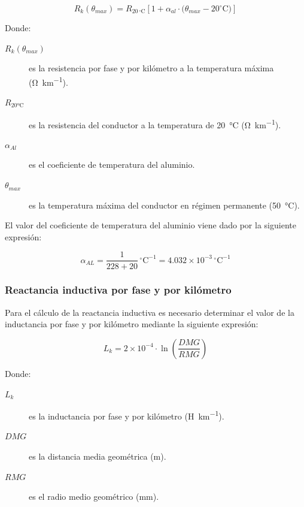 \begin{equation}
\label{eq:cdt-resistencia}
R_k(\theta_{max}) =
R_{20\,^{\circ}\mathrm{C}}
\left[ 1 + \alpha_{al} \cdot
\bigl(\theta_{max} - 20^{\circ}\mathrm{C}\bigr) \right]
\end{equation}

Donde:
\begin{description}
  \item[$R_k(\theta_{max})$] es la resistencia por fase y por kilómetro a la temperatura máxima (\si{\ohm\per\kilo\meter}).
  \item[$R_{\text{20ºC}}$] es la resistencia del conductor a la temperatura de \SI{20}{\celsius} (\si{\ohm\per\kilo\meter}).
  \item[$\alpha_{Al}$] es el coeficiente de temperatura del aluminio.
  \item[$\theta_{max}$] es la temperatura máxima del conductor en régimen permanente (\SI{50}{\celsius}).
\end{description}
El valor del coeficiente de temperatura del aluminio viene dado por la siguiente expresión:

\begin{equation}
\label{eq:cdt-alfaAl}
\alpha_{AL}
= \frac{1}{228 + 20}\,^{\circ}\mathrm{C}^{-1}
= 4.032 \times 10^{-3}\,^{\circ}\mathrm{C}^{-1}
\end{equation}


\subsubsection{Reactancia inductiva por fase y por kilómetro}
\label{subsubsec:cdt-reactancia}
Para el cálculo de la reactancia inductiva es necesario determinar el valor de la inductancia por fase y por kilómetro mediante la siguiente expresión:

\begin{equation}
\label{eq:cdt-inductancia}
L_k = 2 \times 10^{-4} \cdot \ln{(\frac{DMG}{RMG})}
\end{equation}

Donde:
\begin{description}
  \item[$L_k$] es la inductancia por fase y por kilómetro (\si{\henry\per\kilo\meter}).
  \item[$DMG$] es la distancia media geométrica (\si{\meter}).
  \item[$RMG$] es el radio medio geométrico (\si{\milli\meter}).
\end{description}

